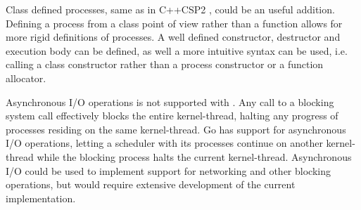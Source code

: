 Class defined processes, same as in C++CSP2 \citep{brown2007c++csp2}, could be an useful addition. Defining a process from a class point of view rather than a function allows for more rigid definitions of processes. A well defined constructor, destructor and execution body can be defined, as well a more intuitive syntax can be used, i.e. calling a class constructor rather than a process constructor or a function allocator.

Asynchronous I/O operations is not supported with \Proxc{}. Any call to a blocking system call effectively blocks the entire kernel\hyp{}thread, halting any progress of processes residing on the same kernel\hyp{}thread. Go has support for asynchronous I/O operations, letting a scheduler with its processes continue on another kernel\hyp{}thread while the blocking process halts the current kernel\hyp{}thread. Asynchronous I/O could be used to implement support for networking and other blocking operations, but would require extensive development of the current implementation.


